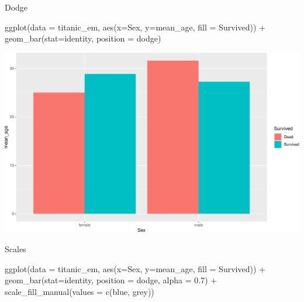 \documentclass[
]{book}
\newenvironment{Shaded}{\begin{snugshade}}{\end{snugshade}}
\newcommand{\AttributeTok}[1]{\textcolor[rgb]{0.77,0.63,0.00}{#1}}
\newcommand{\FloatTok}[1]{\textcolor[rgb]{0.00,0.00,0.81}{#1}}
\newcommand{\FunctionTok}[1]{\textcolor[rgb]{0.00,0.00,0.00}{#1}}
\newcommand{\NormalTok}[1]{#1}
\newcommand{\SpecialCharTok}[1]{\textcolor[rgb]{0.00,0.00,0.00}{#1}}
\newcommand{\StringTok}[1]{\textcolor[rgb]{0.31,0.60,0.02}{#1}}
\begin{document}
Dodge

\begin{Shaded}
\begin{Highlighting}[]
\FunctionTok{ggplot}\NormalTok{(}\AttributeTok{data =}\NormalTok{ titanic\_em, }\FunctionTok{aes}\NormalTok{(}\AttributeTok{x=}\NormalTok{Sex, }\AttributeTok{y=}\NormalTok{mean\_age, }\AttributeTok{fill =}\NormalTok{ Survived)) }\SpecialCharTok{+} \FunctionTok{geom\_bar}\NormalTok{(}\AttributeTok{stat=}\StringTok{\textquotesingle{}identity\textquotesingle{}}\NormalTok{, }\AttributeTok{position =} \StringTok{\textquotesingle{}dodge\textquotesingle{}}\NormalTok{) }
\end{Highlighting}
\end{Shaded}

\includegraphics{figures/unnamed-chunk-146-1.pdf}

Scales

\begin{Shaded}
\begin{Highlighting}[]
\FunctionTok{ggplot}\NormalTok{(}\AttributeTok{data =}\NormalTok{ titanic\_em, }\FunctionTok{aes}\NormalTok{(}\AttributeTok{x=}\NormalTok{Sex, }\AttributeTok{y=}\NormalTok{mean\_age, }\AttributeTok{fill =}\NormalTok{ Survived)) }\SpecialCharTok{+} \FunctionTok{geom\_bar}\NormalTok{(}\AttributeTok{stat=}\StringTok{\textquotesingle{}identity\textquotesingle{}}\NormalTok{, }\AttributeTok{position =} \StringTok{\textquotesingle{}dodge\textquotesingle{}}\NormalTok{, }\AttributeTok{alpha =} \FloatTok{0.7}\NormalTok{) }\SpecialCharTok{+} \FunctionTok{scale\_fill\_manual}\NormalTok{(}\AttributeTok{values =} \FunctionTok{c}\NormalTok{(}\StringTok{\textquotesingle{}blue\textquotesingle{}}\NormalTok{, }\StringTok{\textquotesingle{}grey\textquotesingle{}}\NormalTok{))}
\end{Highlighting}
\end{Shaded}
\end{document}

